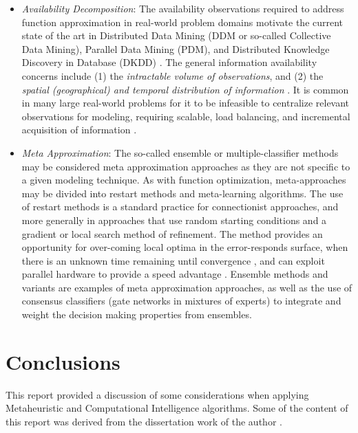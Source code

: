 \documentclass[a4paper, 11pt]{article}
\begin{document}
\begin{itemize}
	\item \emph{Availability Decomposition}: The availability observations required to address function approximation in real-world problem domains motivate the current state of the art in Distributed Data Mining (DDM or so-called Collective Data Mining), Parallel Data Mining (PDM), and Distributed Knowledge Discovery in Database (DKDD) \cite{Kargupta2000}. The general information availability concerns include (1) the \emph{intractable volume of observations}, and (2) the \emph{spatial (geographical) and temporal distribution of information} \cite{Zaki1999}. It is common in many large real-world problems for it to be infeasible to centralize relevant observations for modeling, requiring scalable, load balancing, and incremental acquisition of information \cite{Skillicorn1999}. 
	
	\item \emph{Meta Approximation}: The so-called ensemble or multiple-classifier methods may be considered meta approximation approaches as they are not specific to a given modeling technique. As with function optimization, meta-approaches may be divided into restart methods and meta-learning algorithms. The use of restart methods is a standard practice for connectionist approaches, and more generally in approaches that use random starting conditions and a gradient or local search method of refinement. The method provides an opportunity for over-coming local optima in the error-responds surface, when there is an unknown time remaining until convergence \cite{Magdon-ismail2000}, and can exploit parallel hardware to provide a speed advantage \cite{Blas2005}. Ensemble methods and variants are examples of meta approximation approaches, as well as the use of consensus classifiers (gate networks in mixtures of experts) to integrate and weight the decision making properties from ensembles. 
\end{itemize}



\section{Conclusions}
\label{sec:conclusions}
This report provided a discussion of some considerations when applying Metaheuristic and Computational Intelligence algorithms.
Some of the content of this report was derived from the dissertation work of the author \cite{Brownlee2008}.



\end{document}
